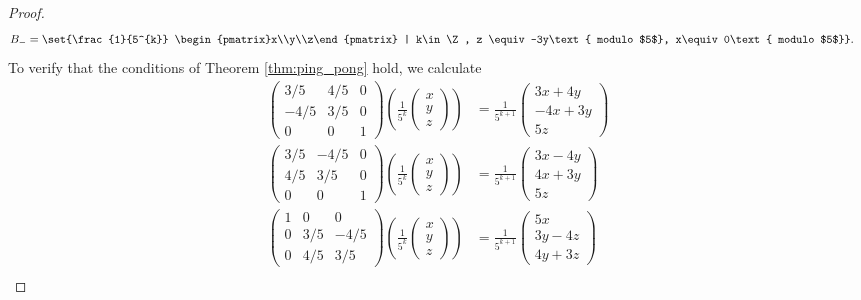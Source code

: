 \begin{proof}
\begin{align*}
    B_{-} &= \set{\frac{1}{5^{k}} \begin{pmatrix}x\\y\\z\end{pmatrix} | k\in \Z, z \equiv -3y\text{ modulo $5$}, x\equiv 0\text{ modulo $5$}}.
  \end{align*}
  To verify that the conditions of Theorem \ref{thm:ping_pong} hold, we calculate
  \begin{align*}
    \begin{pmatrix}3/5 & 4/5 & 0 \\ -4/5 & 3/5 & 0 \\ 0 & 0 & 1\end{pmatrix}\left(\frac{1}{5^k} \begin{pmatrix}x\\y\\z\end{pmatrix}\right) &= \frac{1}{5^{k+1}} \begin{pmatrix}3x + 4y \\ -4x + 3y \\ 5z\end{pmatrix}\tag*{(1)}\\
    \begin{pmatrix}3/5 & -4/5 & 0 \\ 4/5 & 3/5 & 0 \\ 0 & 0 & 1\end{pmatrix} \left(\frac{1}{5^k} \begin{pmatrix}x\\y\\z\end{pmatrix}\right) &= \frac{1}{5^{k+1}} \begin{pmatrix}3x - 4y \\ 4x + 3y \\ 5z\end{pmatrix}\tag*{(2)}\\
    \begin{pmatrix}1 & 0 & 0 \\ 0 & 3/5 & -4/5 \\ 0 & 4/5 & 3/5\end{pmatrix}\left(\frac{1}{5^{k}} \begin{pmatrix}x\\y\\z\end{pmatrix}\right) &= \frac{1}{5^{k+1}} \begin{pmatrix}5x \\ 3y- 4z \\ 4y + 3z\end{pmatrix}\tag*{(3)}\\

\end{align*}
\end{proof}
